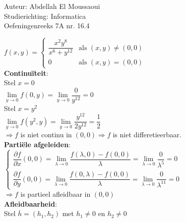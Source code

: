 \documentclass[a4paper]{article}
\begin{document}
  
\noindent \large Auteur: Abdellah El Moussaoui \\
\noindent \large Studierichting: Informatica\\
\noindent \large Oefeningenreeks 7A nr. 16.4\\

\medskip

\normalsize

$f(x,y) = 
\left\{ 
\begin{array}{ll} 
\dfrac{x^2y^8}{x^6+y^{12}} & \text{als } (x,y) \neq (0,0)\\[2ex] 
0 & \text{als } (x,y) = (0,0) 
\end{array} 
\right.$ \\

\textbf{Continuïteit}:\\

Stel $x = 0$\\

$\lim\limits_{y\rightarrow 0} f(0,y) = \lim\limits_{y\rightarrow 0} \dfrac{0}{y^{12}}=0$\\

Stel $x = y^2$\\

$\lim\limits_{y\rightarrow 0} f(y^2,y) = \lim\limits_{y\rightarrow 0} \dfrac{y^{12}}{2y^{12}}=\dfrac{1}{2}$\\

$\Rightarrow f$ is niet continu in $(0,0) \Rightarrow f$ is niet differetieerbaar. \\

\textbf{Partiële afgeleiden}:\\

$\left\{ 
\begin{array}{l} 
\dfrac{\partial f}{\partial x}(0,0) = \lim\limits_{\lambda \rightarrow 0} \dfrac{f(\lambda,0) - f(0,0)}{\lambda} = \lim\limits_{\lambda \rightarrow 0} \dfrac{0}{\lambda^5} = 0 \\[2ex] 
\dfrac{\partial f}{\partial y}(0,0) = \lim\limits_{\lambda \rightarrow 0} \dfrac{f(0,\lambda) - f(0,0)}{\lambda} = \lim\limits_{\lambda \rightarrow 0} \dfrac{0}{\lambda^{11}} = 0 
\end{array} 
\right.$ \\

$\Rightarrow f$ is partieel afleidbaar in $(0,0)$\\

\textbf{Afleidbaarheid}:\\

Stel $\overline{h} = (h_1,h_2)$ met $h_1 \neq 0$ en $h_2 \neq 0$\\
\end{document}
